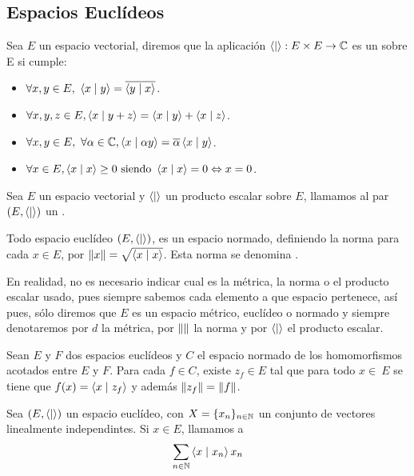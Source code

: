 \subsection{Espacios Euclídeos}
\begin{definicion}
  \label{producto_escalar}
  Sea $E$ un espacio vectorial, diremos que la aplicación $\left\langle\mid\right\rangle:E\times E \rightarrow \mathbb{C}$ es un  sobre E si cumple:
  \begin{itemize}
    \item $\forall x,y \in E,\ \braket{x}{y}=\overline{\braket{y}{x}}$.
    \item $\forall x,y,z \in E, \left\langle x\mid y+z\right\rangle=\left\langle x\mid y\right\rangle+\left\langle x\mid z\right\rangle$.
    \item $\forall x,y \in E,\ \forall\alpha\in\C, \braket{x}{\alpha y}=\overline{\alpha}\braket{x}{y}$.
    \item $\forall x \in E, \left\langle x\mid x\right\rangle\geq 0 \text{ siendo } \left\langle x\mid x\right\rangle=0\Leftrightarrow x = 0$.
  \end{itemize}
\end{definicion}

\begin{definicion}
  \label{espacio_euclideo}
  Sea $E$ un espacio vectorial y $\left\langle\mid\right\rangle$ un producto escalar sobre $E$, llamamos al par $(E, \left\langle\mid\right\rangle)$ un .
\end{definicion}

Todo espacio euclídeo $(E, \left\langle\mid\right\rangle)$, es un espacio normado, definiendo la norma para cada $x\in E$, por $\lVert x\rVert=\sqrt{\left\langle x\mid x\right\rangle}$. Esta norma se denomina .

En realidad, no es necesario indicar cual es la métrica, la norma o el producto escalar usado, pues siempre sabemos cada elemento a que espacio pertenece, así pues, sólo diremos que $E$ es un espacio métrico, euclídeo o normado y siempre denotaremos por $d$ la métrica, por $\lVert\rVert$ la norma y por $\left\langle\mid\right\rangle$ el producto escalar.

\begin{resultado}[Riesz]
  Sean $E$ y $F$ dos espacios euclídeos y $C$ el espacio normado de los homomorfismos acotados entre $E$ y $F$. Para cada $f\in C$, existe $z_f\in E$ tal que para todo $x\in\ E$ se tiene que $f(x)=\left\langle x\mid z_f\right\rangle$ y además $\lVert z_f\rVert=\lVert f\rVert$.
\end{resultado}

\begin{definicion}
  Sea $(E, \left\langle\mid\right\rangle)$ un espacio euclídeo, con $X=\{x_n\}_{n\in\mathbb{N}}$ un conjunto de vectores linealmente independintes. Si $x\in E$, llamamos  a
  \begin{equation}
    \sum_{n\in\mathbb{N}}\left\langle x\mid x_n\right\rangle x_n
  \end{equation}
\end{definicion}

